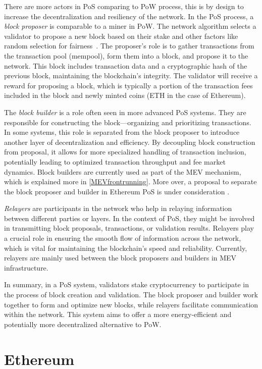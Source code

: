 There are more actors in PoS comparing to PoW process, this is by design to increase the decentralization and resiliency of the network. In the PoS process, a \textit{block proposer} is comparable to a miner in PoW. The network algorithm selects a validator to propose a new block based on their stake and other factors like random selection for fairness~\cite{ethereumrandao}. The proposer's role is to gather transactions from the transaction pool (mempool), form them into a block, and propose it to the network. This block includes transaction data and a cryptographic hash of the previous block, maintaining the blockchain's integrity. The validator will receive a reward for proposing a block, which is typically a portion of the transaction fees included in the block and newly minted coins (ETH in the case of Ethereum).

The \textit{block builder} is a role often seen in more advanced PoS systems. They are responsible for constructing the block---organizing and prioritizing transactions. In some systems, this role is separated from the block proposer to introduce another layer of decentralization and efficiency. By decoupling block construction from proposal, it allows for more specialized handling of transaction inclusion, potentially leading to optimized transaction throughput and fee market dynamics. Block builders are currently used as part of the MEV mechanism, which is explained more in \ref{MEVfrontrunning}. More over, a proposal to separate the block proposer and builder in Ethereum PoS is under consideration \cite{ethereumPBS}.

\textit{Relayers} are participants in the network who help in relaying information between different parties or layers. In the context of PoS, they might be involved in transmitting block proposals, transactions, or validation results. Relayers play a crucial role in ensuring the smooth flow of information across the network, which is vital for maintaining the blockchain's speed and reliability. Currently, relayers are mainly used between the block proposers and builders in MEV infrastructure.

In summary, in a PoS system, validators stake cryptocurrency to participate in the process of block creation and validation. The block proposer and builder work together to form and optimize new blocks, while relayers facilitate communication within the network. This system aims to offer a more energy-efficient and potentially more decentralized alternative to PoW.


\section{Ethereum}\label{ethereumbackground}

